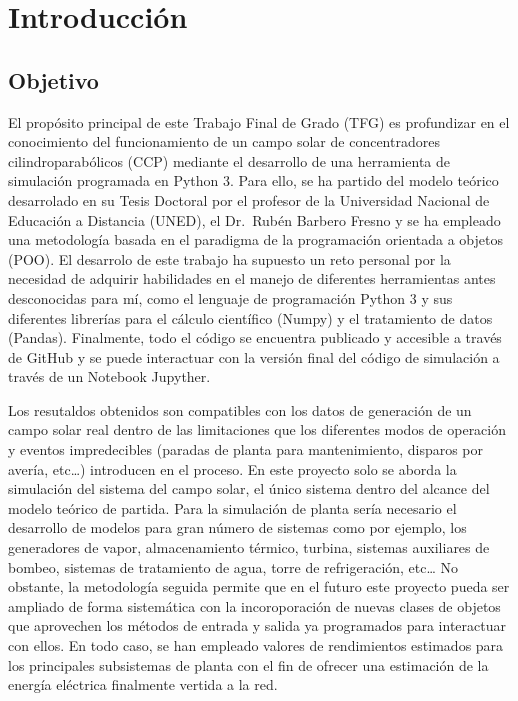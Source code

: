 \chapter{Introducción}
\label{introduccion}

\section{Objetivo}
El propósito principal de este Trabajo Final de Grado (TFG) es profundizar en el conocimiento del funcionamiento de un campo solar de concentradores cilindroparabólicos (CCP) mediante el desarrollo de una herramienta de simulación programada en Python 3. Para ello, se ha partido del modelo teórico desarrolado en su Tesis Doctoral por el profesor de la Universidad Nacional de Educación a Distancia (UNED), el Dr.~Rubén Barbero Fresno y se ha empleado una metodología basada en el paradigma de la programación orientada a objetos (POO). El desarrolo de este trabajo ha supuesto un reto personal por la necesidad de adquirir habilidades en el manejo de diferentes herramientas antes desconocidas para mí, como el lenguaje de programación Python 3 y sus diferentes librerías para el cálculo científico (Numpy) y el tratamiento de datos (Pandas). Finalmente, todo el código se encuentra publicado y accesible a través de GitHub y se puede interactuar con la versión final del código de simulación a través de un Notebook Jupyther.

Los resutaldos obtenidos son compatibles con los datos de generación de un campo solar real dentro de las limitaciones que los diferentes modos de operación y eventos impredecibles (paradas de planta para mantenimiento, disparos por avería, etc\ldots{}) introducen en el proceso. En este proyecto solo se aborda la simulación del sistema del campo solar, el único sistema dentro del alcance del modelo teórico de partida. Para la simulación de planta sería necesario el desarrollo de
modelos para gran número de sistemas como por ejemplo, los generadores de vapor, almacenamiento térmico, turbina, sistemas auxiliares de bombeo, sistemas de tratamiento de agua, torre de refrigeración, etc\ldots{} No obstante, la metodología seguida permite que en el futuro este proyecto pueda ser ampliado de forma sistemática con la incoroporación de nuevas clases de objetos que aprovechen los métodos de entrada y salida ya programados para interactuar con ellos. En todo caso, se han empleado valores de rendimientos estimados para los principales subsistemas de planta con el fin de ofrecer una estimación de la energía eléctrica finalmente vertida a la red.

